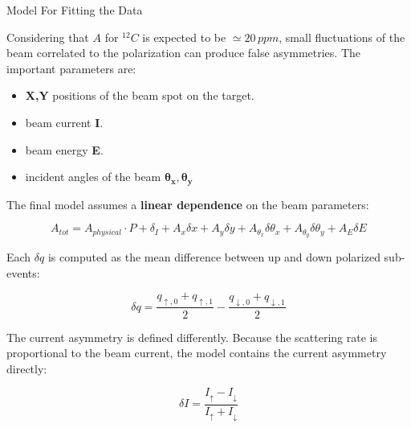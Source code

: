 \documentclass[9pt,a4paper]{beamer}
\begin{document}
\begin{frame}[t]{Model For Fitting the Data}

Considering that $A$ for $^{12}C$ is expected to be $\simeq 20 \, ppm$, small fluctuations of the beam correlated to the polarization can produce false asymmetries. The important parameters are:

\begin{itemize}
\item \textbf{X,Y} positions of the beam spot on the target.
\item beam current \textbf{I}.
\item beam energy \textbf{E}.
\item incident angles of the beam {$\bm{\theta_{x}},\bm{\theta_{y}}$}
\end{itemize}

The final model assumes a \textbf{linear dependence} on the beam parameters:

\begin{equation}
A_{tot} = A_{physical} \cdot P + \delta_{I} + A_{x} \delta x + A_{y} \delta y + A_{\theta_{x}} \delta \theta_{x} + A_{\theta_{y}} \delta \theta_{y}+ A_{E} \delta E 
\end{equation}

Each $\delta q$ is computed as the mean difference between up and down polarized sub-events:

\begin{equation}
\delta q = \dfrac{q_{\uparrow,0} + q_{\uparrow,1}}{2} - \dfrac{q_{\downarrow,0} + q_{\downarrow,1}}{2}
\end{equation}

The current asymmetry is defined differently. Because the scattering rate is proportional to the beam current, the model contains the current asymmetry directly:

\begin{equation}
\delta I = \dfrac{I_{\uparrow} - I_{\downarrow}}{I_{\uparrow} + I_{\downarrow}}
\end{equation}

\end{frame}
\end{document}
